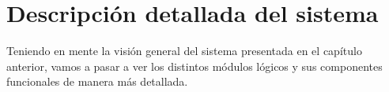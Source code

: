 
\chapter{Descripción detallada del sistema}

Teniendo en mente la visión general del sistema presentada en el capítulo anterior,
vamos a pasar a ver los distintos módulos lógicos y sus componentes funcionales de
manera más detallada.